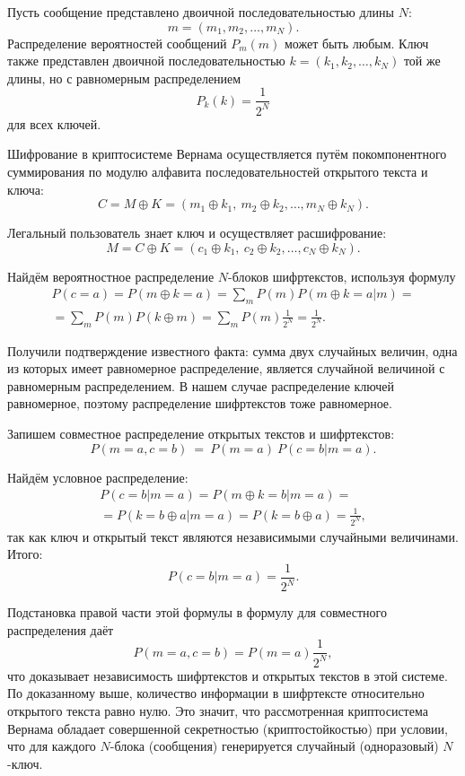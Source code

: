 Пусть сообщение представлено двоичной последовательностью длины $N$:
    \[ m = (m_1, m_2, \dots, m_N). \]
Распределение вероятностей сообщений $P_m(m)$ может быть любым. Ключ также представлен двоичной последовательностью $ k = (k_1, k_2, \dots, k_N)$ той же длины, но с равномерным распределением
    \[ P_k(k) = \frac{1}{2^N} \]
для всех ключей.

Шифрование в криптосистеме Вернама осуществляется путём покомпонентного суммирования по модулю алфавита последовательностей открытого текста и ключа:
    \[ C = M \oplus K = (m_1 \oplus k_1, ~ m_2 \oplus k_2, \dots, m_N \oplus k_N). \]

Легальный пользователь знает ключ и осуществляет расшифрование:
    \[ M =C \oplus K = (c_1 \oplus k_1, ~ c_2 \oplus k_2, \dots, c_N \oplus k_N). \]

Найдём вероятностное распределение $N$-блоков шифртекстов, используя формулу
\begin{multline*}
P(c = a) = P(m \oplus k = a) = \sum_{m} P(m) P(m \oplus k = a | m) = \\
= \sum_{m} P(m) P(k \oplus m) = \sum_{m} P(m) \frac{1}{2^N} = \frac{1}{2^N}. 
\end{multline*}


Получили подтверждение известного факта: сумма двух случайных величин, одна из которых имеет равномерное распределение, является случайной величиной с равномерным распределением. В нашем случае распределение ключей равномерное, поэтому распределение шифртекстов тоже равномерное.

Запишем совместное распределение открытых текстов и шифртекстов:
    \[ P(m = a, c = b) ~=~ P(m = a) ~ P(c = b | m = a). \]

Найдём условное распределение:
\begin{multline*}
    P(c = b | m = a) = P(m \oplus k = b | m = a) = \\
    = P(k = b \oplus a | m = a) = P(k = b \oplus a) = \frac{1}{2^N},
\end{multline*}
так как ключ и открытый текст являются независимыми случайными величинами. Итого:
    \[ P(c=b | m=a) = \frac{1}{2^N}. \]

Подстановка правой части этой формулы в формулу для совместного распределения даёт
    \[ P(m=a,c=b)=P(m=a)\frac{1}{2^N}, \]
что доказывает независимость шифртекстов и открытых текстов в этой системе. По доказанному выше, количество информации в шифртексте относительно открытого текста равно нулю. Это значит, что рассмотренная криптосистема Вернама обладает совершенной секретностью (криптостойкостью) при условии, что для каждого $N$-блока (сообщения) генерируется случайный (одноразовый) $N$-ключ.



